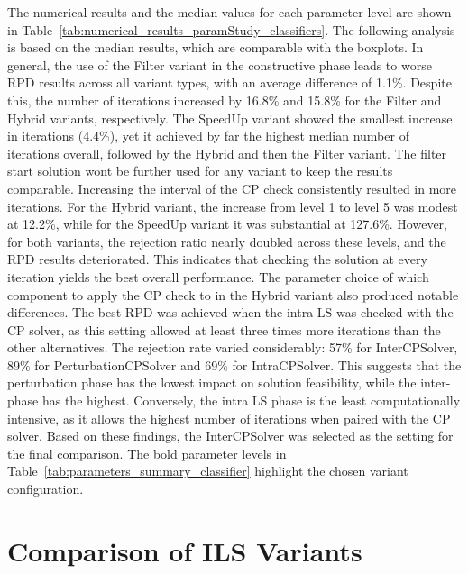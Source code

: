 The numerical results and the median values for each parameter level are shown in Table~\ref{tab:numerical_results_paramStudy_classifiers}.
The following analysis is based on the median results, which are comparable with the boxplots.
In general, the use of the Filter variant in the constructive phase leads to worse RPD results across all variant types,
with an average difference of 1.1\%. Despite this, the number of iterations increased by 16.8\% and 15.8\% for the Filter and Hybrid variants,
respectively. The SpeedUp variant showed the smallest increase in iterations (4.4\%), yet it achieved by far the highest median
number of iterations overall, followed by the Hybrid and then the Filter variant. The filter start solution wont be further used for any variant to
keep the results comparable. Increasing the interval of the \gls{CP} check consistently resulted in more iterations. For the Hybrid variant,
the increase from level 1 to level 5 was modest at 12.2\%, while for the SpeedUp variant it was substantial at 127.6\%. However, for both
variants, the rejection ratio nearly doubled across these levels, and the RPD results deteriorated. This indicates that checking the solution
at every iteration yields the best overall performance. The parameter choice of which component to apply the \gls{CP} check to in the Hybrid variant also produced notable differences.
The best RPD was achieved when the intra \gls{LS} was checked with the \gls{CP} solver, as this setting allowed at least three times more
iterations than the other alternatives. The rejection rate varied considerably: 57\% for InterCPSolver, 89\% for PerturbationCPSolver
and 69\% for IntraCPSolver. This suggests that the perturbation phase has the lowest impact on solution feasibility, while the inter-phase
has the highest. Conversely, the intra \gls{LS} phase is the least computationally intensive, as it allows the highest number of iterations
when paired with the \gls{CP} solver. Based on these findings, the InterCPSolver was selected as the setting for the final comparison.
The bold parameter levels in Table~\ref{tab:parameters_summary_classifier} highlight the chosen variant configuration.

\section{Comparison of ILS Variants}
\label{sec:comparison_ils_variants}

